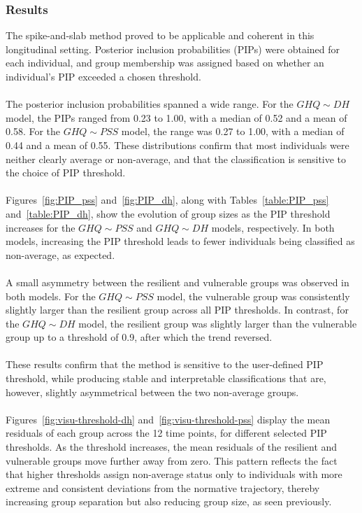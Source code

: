 \documentclass[12pt]{article}
\begin{document}
\subsubsection{Results}
The spike-and-slab method proved to be applicable and coherent in this longitudinal setting. Posterior inclusion probabilities (PIPs) were obtained for each individual, and group membership was assigned based on whether an individual’s PIP exceeded a chosen threshold. \\
\\
The posterior inclusion probabilities spanned a wide range. For the $GHQ\sim DH$ model, the PIPs ranged from 0.23 to 1.00, with a median of 0.52 and a mean of 0.58. For the $GHQ \sim PSS$ model, the range was 0.27 to 1.00, with a median of 0.44 and a mean of 0.55. These distributions confirm that most individuals were neither clearly average or non-average, and that the classification is sensitive to the choice of PIP threshold.\\
\\
Figures~\ref{fig:PIP_pss} and~\ref{fig:PIP_dh}, along with Tables~\ref{table:PIP_pss} and~\ref{table:PIP_dh}, show the evolution of group sizes as the PIP threshold increases for the $GHQ\sim PSS$ and $GHQ\sim DH$ models, respectively. In both models, increasing the PIP threshold leads to fewer individuals being classified as non-average, as expected.\\
\\
A small asymmetry between the resilient and vulnerable groups was observed in both models. For the $GHQ\sim PSS$  model, the vulnerable group was consistently slightly larger than the resilient group across all PIP thresholds. In contrast, for the $GHQ\sim DH$ model, the resilient group was slightly larger than the vulnerable group up to a threshold of 0.9, after which the trend reversed.\\
\\
These results confirm that the method is sensitive to the user-defined PIP threshold, while producing stable and interpretable classifications that are, however, slightly asymmetrical between the two non-average groups.\\
\\
Figures~\ref{fig:visu-threshold-dh} and~\ref{fig:visu-threshold-pss} display the mean residuals of each group across the 12 time points, for different selected PIP thresholds. As the threshold increases, the mean residuals of the resilient and vulnerable groups move further away from zero. This pattern reflects the fact that higher thresholds assign non-average status only to individuals with more extreme and consistent deviations from the normative trajectory, thereby increasing group separation but also reducing group size, as seen previously.
\end{document}

